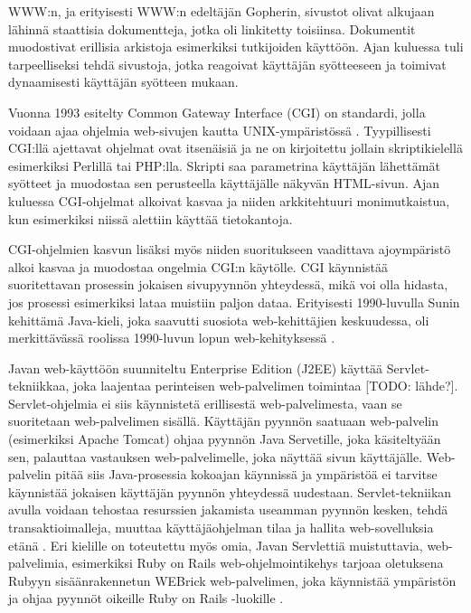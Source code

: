 WWW:n, ja erityisesti WWW:n edeltäjän Gopherin, sivustot olivat alkujaan lähinnä staattisia dokumentteja, jotka oli linkitetty toisiinsa. Dokumentit muodostivat erillisia arkistoja esimerkiksi tutkijoiden käyttöön. Ajan kuluessa tuli tarpeelliseksi tehdä sivustoja, jotka reagoivat käyttäjän syötteeseen ja toimivat dynaamisesti käyttäjän syötteen mukaan.

Vuonna 1993 esitelty Common Gateway Interface (CGI) on standardi, jolla voidaan ajaa ohjelmia web-sivujen kautta UNIX-ympäristössä \cite{rfc3875}. Tyypillisesti CGI:llä ajettavat ohjelmat ovat itsenäisiä ja ne on kirjoitettu jollain skriptikielellä esimerkiksi Perlillä tai PHP:lla. Skripti saa parametrina käyttäjän lähettämät syötteet ja muodostaa sen perusteella käyttäjälle näkyvän HTML-sivun. Ajan kuluessa CGI-ohjelmat alkoivat kasvaa ja niiden arkkitehtuuri monimutkaistua, kun esimerkiksi niissä alettiin käyttää tietokantoja.

CGI-ohjelmien kasvun lisäksi myös niiden suoritukseen vaadittava ajoympäristö alkoi kasvaa ja muodostaa ongelmia CGI:n käytölle. CGI käynnistää suoritettavan prosessin jokaisen sivupyynnön yhteydessä, mikä voi olla hidasta, jos prosessi esimerkiksi lataa muistiin paljon dataa. Erityisesti 1990-luvulla Sunin kehittämä Java-kieli, joka saavutti suosiota web-kehittäjien keskuudessa, oli merkittävässä roolissa 1990-luvun lopun web-kehityksessä \cite{uml}.

Javan web-käyttöön suunniteltu Enterprise Edition (J2EE) käyttää Servlet-tekniikkaa, joka laajentaa perinteisen web-palvelimen toimintaa [TODO: lähde?]. Servlet-ohjelmia ei siis käynnistetä erillisestä web-palvelimesta, vaan se suoritetaan web-palvelimen sisällä. Käyttäjän pyynnön saatuaan web-palvelin (esimerkiksi Apache Tomcat) ohjaa pyynnön Java Servetille, joka käsiteltyään sen, palauttaa vastauksen web-palvelimelle, joka näyttää sivun käyttäjälle. Web-palvelin pitää siis Java-prosessia kokoajan käynnissä ja ympäristöä ei tarvitse käynnistää jokaisen käyttäjän pyynnön yhteydessä uudestaan. Servlet-tekniikan avulla voidaan tehostaa resurssien jakamista useamman pyynnön kesken, tehdä transaktioimalleja, muuttaa käyttäjäohjelman tilaa ja hallita web-sovelluksia etänä \cite{uml}. Eri kielille on toteutettu myös omia, Javan Servlettiä muistuttavia, web-palvelimia, esimerkiksi Ruby on Rails web-ohjelmointikehys tarjoaa oletuksena Rubyyn sisäänrakennetun WEBrick web-palvelimen, joka käynnistää ympäristön ja ohjaa pyynnöt oikeille Ruby on Rails -luokille \cite{ruby2011agile}.

